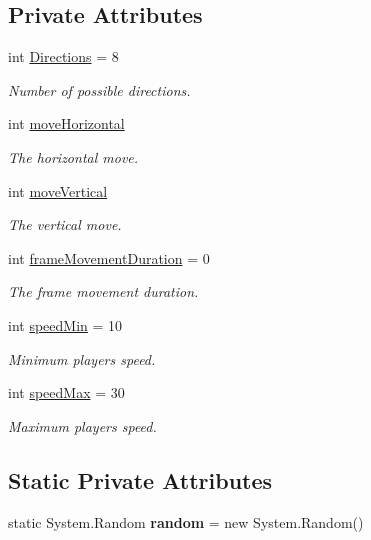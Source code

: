 \subsection*{Private Attributes}
\begin{DoxyCompactItemize}
\item 
int \mbox{\hyperlink{class_a_i_enemy_aac1e9e1605e348d4252c1821153d85c0}{Directions}} = 8
\begin{DoxyCompactList}\small\item\em Number of possible directions. \end{DoxyCompactList}\item 
int \mbox{\hyperlink{class_a_i_enemy_a41516ff1fdd82b5f525ecd24c3cc6568}{move\+Horizontal}}
\begin{DoxyCompactList}\small\item\em The horizontal move. \end{DoxyCompactList}\item 
int \mbox{\hyperlink{class_a_i_enemy_a4674ac2fe0e792a513de9e959c615a34}{move\+Vertical}}
\begin{DoxyCompactList}\small\item\em The vertical move. \end{DoxyCompactList}\item 
int \mbox{\hyperlink{class_a_i_enemy_a64bd459602d0d4fc4a6c7a109115c252}{frame\+Movement\+Duration}} = 0
\begin{DoxyCompactList}\small\item\em The frame movement duration. \end{DoxyCompactList}\item 
int \mbox{\hyperlink{class_a_i_enemy_a139bff4cd9f7cbebdc947c4192049e54}{speed\+Min}} = 10
\begin{DoxyCompactList}\small\item\em Minimum player\textquotesingle{}s speed. \end{DoxyCompactList}\item 
int \mbox{\hyperlink{class_a_i_enemy_ab58b10c5bfa39b50fa545840a9c1270b}{speed\+Max}} = 30
\begin{DoxyCompactList}\small\item\em Maximum player\textquotesingle{}s speed. \end{DoxyCompactList}\end{DoxyCompactItemize}
\subsection*{Static Private Attributes}
\begin{DoxyCompactItemize}
\item 
\mbox{\label{class_a_i_enemy_a5eb249d35ecb3eeadb7ef100e4f0ea93}} 
static System.\+Random {\bfseries random} = new System.\+Random()
\end{DoxyCompactItemize}


